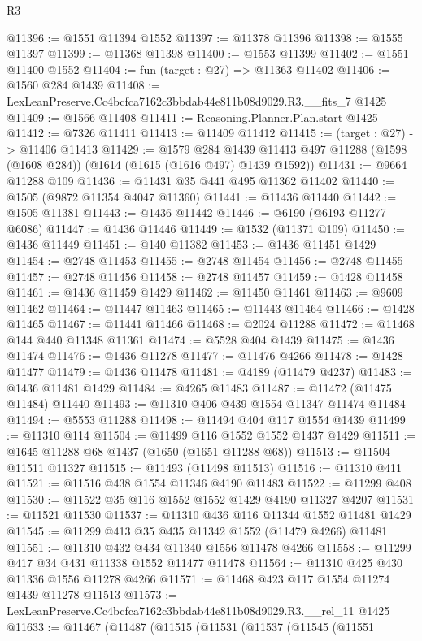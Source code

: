 \begin{lexlean}{R3}
\begin{coremodule}
@11396 := @1551 @11394 @1552
@11397 := @11378 @11396
@11398 := @1555 @11397
@11399 := @11368 @11398
@11400 := @1553 @11399
@11402 := @1551 @11400 @1552
@11404 := fun (target : @27) => @11363 @11402
@11406 := @1560 @284 @1439
@11408 := LexLeanPreserve.Cc4bcfca7162c3bbdab44e811b08d9029.R3.__fits_7 @1425
@11409 := @1566 @11408
@11411 := Reasoning.Planner.Plan.start @1425
@11412 := @7326 @11411
@11413 := @11409 @11412
@11415 := (target : @27) -> @11406 @11413
@11429 := @1579
    @284
    @1439
    @11413
    @497
    @11288
    (@1598 (@1608 @284))
    (@1614 (@1615 (@1616 @497) @1439 @1592))
@11431 := @9664 @11288 @109
@11436 := @11431 @35 @441 @495 @11362 @11402
@11440 := @1505 (@9872 @11354 @4047 @11360)
@11441 := @11436 @11440
@11442 := @1505 @11381
@11443 := @1436 @11442
@11446 := @6190 (@6193 @11277 @6086)
@11447 := @1436 @11446
@11449 := @1532 (@11371 @109)
@11450 := @1436 @11449
@11451 := @140 @11382
@11453 := @1436 @11451 @1429
@11454 := @2748 @11453
@11455 := @2748 @11454
@11456 := @2748 @11455
@11457 := @2748 @11456
@11458 := @2748 @11457
@11459 := @1428 @11458
@11461 := @1436 @11459 @1429
@11462 := @11450 @11461
@11463 := @9609 @11462
@11464 := @11447 @11463
@11465 := @11443 @11464
@11466 := @1428 @11465
@11467 := @11441 @11466
@11468 := @2024 @11288
@11472 := @11468 @144 @440 @11348 @11361
@11474 := @5528 @404 @1439
@11475 := @1436 @11474
@11476 := @1436 @11278
@11477 := @11476 @4266
@11478 := @1428 @11477
@11479 := @1436 @11478
@11481 := @4189 (@11479 @4237)
@11483 := @1436 @11481 @1429
@11484 := @4265 @11483
@11487 := @11472 (@11475 @11484) @11440
@11493 := @11310 @406 @439 @1554 @11347 @11474 @11484
@11494 := @5553 @11288
@11498 := @11494 @404 @117 @1554 @1439
@11499 := @11310 @114
@11504 := @11499 @116 @1552 @1552 @1437 @1429
@11511 := @1645 @11288 @68 @1437 (@1650 (@1651 @11288 @68))
@11513 := @11504 @11511 @11327
@11515 := @11493 (@11498 @11513)
@11516 := @11310 @411
@11521 := @11516 @438 @1554 @11346 @4190 @11483
@11522 := @11299 @408
@11530 := @11522 @35 @116 @1552 @1552 @1429 @4190 @11327 @4207
@11531 := @11521 @11530
@11537 := @11310 @436 @116 @11344 @1552 @11481 @1429
@11545 := @11299 @413 @35 @435 @11342 @1552 (@11479 @4266) @11481
@11551 := @11310 @432 @434 @11340 @1556 @11478 @4266
@11558 := @11299 @417 @34 @431 @11338 @1552 @11477 @11478
@11564 := @11310 @425 @430 @11336 @1556 @11278 @4266
@11571 := @11468 @423 @117 @1554 @11274 @1439 @11278 @11513
@11573 := LexLeanPreserve.Cc4bcfca7162c3bbdab44e811b08d9029.R3.__rel_11 @1425
@11633 := @11467
    (@11487
      (@11515
        (@11531
          (@11537
            (@11545
              (@11551

\end{coremodule}
\end{lexlean}
